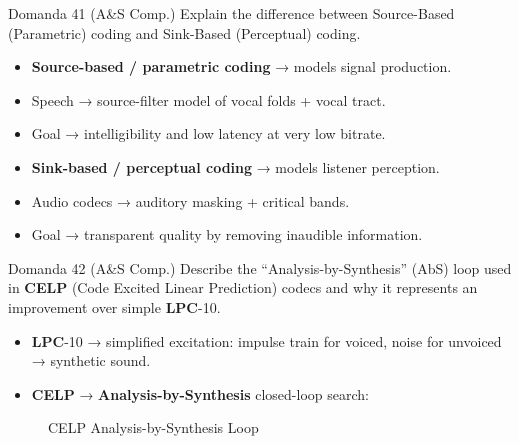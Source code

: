 \begin{questionbox}{Domanda 41}
(A\&S Comp.) Explain the difference between Source-Based (Parametric) coding and Sink-Based (Perceptual) coding.
\end{questionbox}


\begin{itemize}
  \item \textbf{Source-based / parametric coding} → models signal production.
  \item Speech → source-filter model of vocal folds + vocal tract.
  \item Goal → intelligibility and low latency at very low bitrate.
  \item \textbf{Sink-based / perceptual coding} → models listener perception.
  \item Audio codecs → auditory masking + critical bands.
  \item Goal → transparent quality by removing inaudible information.
\end{itemize}



\begin{questionbox}{Domanda 42}
(A\&S Comp.) Describe the “Analysis-by-Synthesis” (AbS) loop used in \textbf{CELP} (Code Excited Linear Prediction) codecs and why it represents an improvement over simple \textbf{LPC}-10.
\end{questionbox}


\begin{itemize}
  \item \textbf{LPC}-10 → simplified excitation: impulse train for voiced, noise for unvoiced → synthetic sound.
  \item \textbf{CELP} → \textbf{Analysis-by-Synthesis} closed-loop search:
\end{itemize}


\begin{figure}[H]
\centering
{}
\caption{CELP Analysis-by-Synthesis Loop}
\end{figure}


